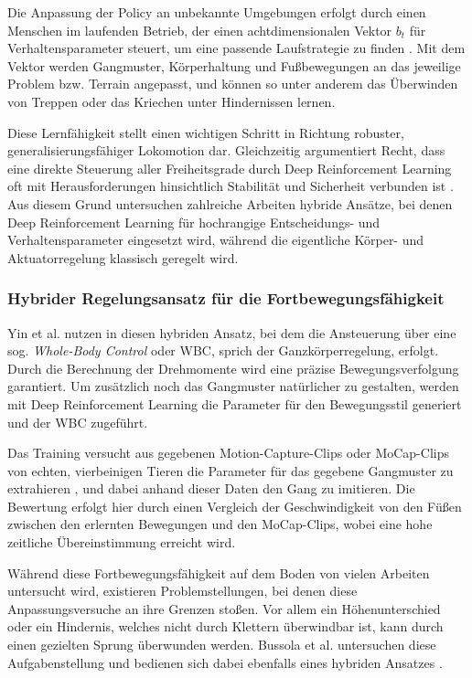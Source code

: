 Die Anpassung der Policy an unbekannte Umgebungen erfolgt durch einen Menschen im laufenden Betrieb, der einen achtdimensionalen Vektor $b_t$ für Verhaltensparameter steuert, um eine passende Laufstrategie zu finden \cite{margolisWalkTheseWays2022}. Mit dem Vektor werden Gangmuster, Körperhaltung und Fußbewegungen an das jeweilige Problem bzw. Terrain angepasst, und können so unter anderem das Überwinden von Treppen oder das Kriechen unter Hindernissen lernen.

Diese Lernfähigkeit stellt einen wichtigen Schritt in Richtung robuster, generalisierungsfähiger Lokomotion dar. Gleichzeitig argumentiert Recht, dass eine direkte Steuerung aller Freiheitsgrade durch Deep Reinforcement Learning oft mit Herausforderungen hinsichtlich Stabilität und Sicherheit verbunden ist \cite{rechtTourReinforcementLearning2018}. Aus diesem Grund untersuchen zahlreiche Arbeiten hybride Ansätze, bei denen Deep Reinforcement Learning für hochrangige Entscheidungs- und Verhaltensparameter eingesetzt wird, während die eigentliche Körper- und Aktuatorregelung klassisch geregelt wird.

\subsubsection{Hybrider Regelungsansatz für die Fortbewegungsfähigkeit}
Yin et al. nutzen in \cite{yinRunDogLearning2021} diesen hybriden Ansatz, bei dem die Ansteuerung über eine sog. \textit{Whole-Body Control} oder WBC, sprich der Ganzkörperregelung, erfolgt. Durch die Berechnung der Drehmomente wird eine präzise Bewegungsverfolgung garantiert. Um zusätzlich noch das Gangmuster natürlicher zu gestalten, werden mit Deep Reinforcement Learning die Parameter für den Bewegungsstil generiert und der WBC zugeführt. 

Das Training versucht aus gegebenen Motion-Capture-Clips oder MoCap-Clips von echten, vierbeinigen Tieren die Parameter für das gegebene Gangmuster zu extrahieren \cite{yinRunDogLearning2021}, und dabei anhand dieser Daten den Gang zu imitieren. Die Bewertung erfolgt hier durch einen Vergleich der Geschwindigkeit von den Füßen zwischen den erlernten Bewegungen und den MoCap-Clips, wobei eine hohe zeitliche Übereinstimmung erreicht wird.

Während diese Fortbewegungsfähigkeit auf dem Boden von vielen Arbeiten untersucht wird, existieren Problemstellungen, bei denen diese Anpassungsversuche an ihre Grenzen stoßen. Vor allem ein Höhenunterschied oder ein Hindernis, welches nicht durch Klettern überwindbar ist, kann durch einen gezielten Sprung überwunden werden. Bussola et al. untersuchen diese Aufgabenstellung und bedienen sich dabei ebenfalls eines hybriden Ansatzes \cite{bussolaGuidedReinforcementLearning2025}.
 
